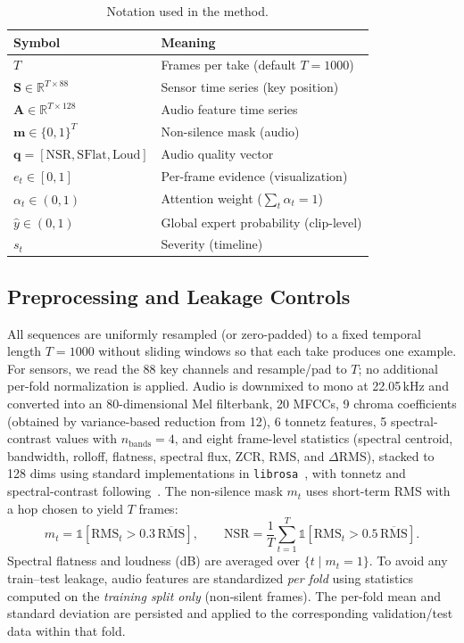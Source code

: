 \documentclass[sigconf,review,anonymous]{acmart}
\begin{document}
\begin{table}[t]
  \centering
  \caption{Notation used in the method.}
  \label{tab:notation}
  \begin{tabular}{@{}ll@{}}
    \toprule
    Symbol & Meaning \\
    \midrule
    $T$ & Frames per take (default $T{=}1000$) \\
    $\mathbf{S}\in\mathbb{R}^{T\times 88}$ & Sensor time series (key position) \\
    $\mathbf{A}\in\mathbb{R}^{T\times 128}$ & Audio feature time series \\
    $\mathbf{m}\in\{0,1\}^{T}$ & Non-silence mask (audio) \\
    $\mathbf{q}=[\mathrm{NSR},\mathrm{SFlat},\mathrm{Loud}]$ & Audio quality vector \\
    $e_t\in[0,1]$ & Per-frame evidence (visualization) \\
    $\alpha_t\in(0,1)$ & Attention weight ($\sum_t \alpha_t{=}1$) \\
    $\hat{y}\in(0,1)$ & Global expert probability (clip-level) \\
    $s_t$ & Severity (timeline) \\
    \bottomrule
  \end{tabular}
\end{table}

\subsection{Preprocessing and Leakage Controls}
\label{subsec:preproc}
All sequences are uniformly resampled (or zero-padded) to a fixed temporal length $T{=}1000$ without sliding windows so that each take produces one example. For sensors, we read the 88 key channels and resample/pad to $T$; no additional per-fold normalization is applied. Audio is downmixed to mono at 22.05\,kHz and converted into an 80-dimensional Mel filterbank, 20 MFCCs, 9 chroma coefficients (obtained by variance-based reduction from 12), 6 tonnetz features, 5 spectral-contrast values with $n_{\text{bands}}{=}4$, and eight frame-level statistics (spectral centroid, bandwidth, rolloff, flatness, spectral flux, ZCR, RMS, and $\Delta$RMS), stacked to 128 dims using standard implementations in \texttt{librosa}~\cite{mcfee2015librosa}, with tonnetz and spectral-contrast following~\cite{HarteSandler2006,Jiang2002}. The non-silence mask $m_t$ uses short-term RMS with a hop chosen to yield $T$ frames:
\[
m_t=\mathbb{1}\![\mathrm{RMS}_t>0.3\,\overline{\mathrm{RMS}}],\qquad
\mathrm{NSR}=\frac{1}{T}\sum_{t=1}^T \mathbb{1}\![\mathrm{RMS}_t>0.5\,\overline{\mathrm{RMS}}].
\]
Spectral flatness and loudness (dB) are averaged over $\{t\mid m_t{=}1\}$. To avoid any train–test leakage, audio features are standardized \emph{per fold} using statistics computed on the \emph{training split only} (non‑silent frames). The per-fold mean and standard deviation are persisted and applied to the corresponding validation/test data within that fold.
\end{document}
